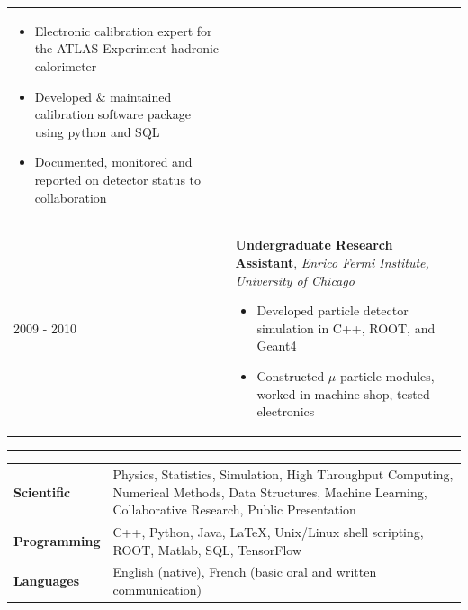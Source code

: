 \documentclass{letter}
\begin{document}
\begin{tabular}{p{}p{}}
\begin{itemize}
		\itemsep0em
		\renewcommand{\labelitemi}{\tiny$\blacksquare$} 
   		\item Electronic calibration expert for the ATLAS Experiment hadronic calorimeter
   		\item Developed \& maintained calibration software package using python and SQL
    		\item Documented, monitored and reported on detector status to collaboration
	\end{itemize}
\\
	2009 - 2010
	&
	\textbf{Undergraduate Research Assistant}, \textit{Enrico Fermi Institute, University of Chicago} \newline
	\vspace{-15pt}      %
	\begin{itemize}
		\itemsep0em
		\renewcommand{\labelitemi}{\tiny$\blacksquare$} 
   		\item Developed particle detector simulation in C++, ROOT, and Geant4 
   		\item Constructed $\mu$ particle modules, worked in machine shop, tested electronics 
	\end{itemize}
\end{tabular}

\vspace{-10pt}

\begin{flushleft}
\Large{\textsc{\textbf{\color{Maroon}{Skills}}}}
\vspace{1pt} %
\hrule
\end{flushleft}

\begin{tabular}{p{}p{}}
	{\bf Scientific} 
	&
	Physics, Statistics, Simulation, High Throughput Computing, Numerical Methods, Data Structures, Machine Learning, Collaborative Research, Public Presentation \newline
\\
	{\bf Programming} 
	&
	C++, Python, Java, \LaTeX{}, Unix/Linux shell scripting, ROOT, Matlab, SQL, TensorFlow \newline
\\ 
	{\bf Languages}
	&
	English (native), French (basic oral and written communication)
\end{tabular}
\end{document}
